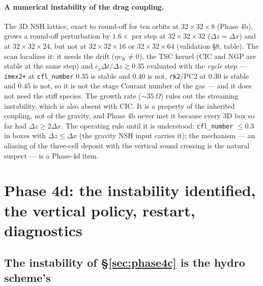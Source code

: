 \documentclass[11pt]{article}
\newcommand{\code}[1]{\texttt{#1}}
\begin{document}
\paragraph{A numerical instability of the drag coupling.} The 3D NSH lattice, exact to
round-off for ten orbits at $32\times32\times8$ (Phase 4b), grows a round-off
perturbation by $1.6\times$ per step at $32\times32\times32$ ($\Delta z = \Delta x$) and
at $32\times32\times24$, but not at $32\times32\times16$ or $32\times32\times64$
(validation \S8, table). The scan localizes it: it needs the drift ($\eta v_K \ne 0$),
the TSC kernel (CIC and NGP are stable at the same step) and $c_s\Delta t/\Delta z
\gtrsim 0.35$ evaluated with the \emph{cycle} step --- \code{imex2+} at
\code{cfl\_number} $0.35$ is stable and $0.40$ is not, \code{rk2}/PC2 at $0.30$ is
stable and $0.45$ is not, so it is not the stage Courant number of the gas --- and it
does not need the stiff species. The growth rate ($\sim 35\,\Omega$) rules out the
streaming instability, which is also absent with CIC. It is a property of the inherited
coupling, not of the gravity, and Phase 4b never met it because every 3D box so far had
$\Delta z \ge 2\Delta x$. The operating rule until it is understood:
\code{cfl\_number} $\le 0.3$ in boxes with $\Delta z \le \Delta x$ (the gravity NSH input
carries it); the mechanism --- an aliasing of the three-cell deposit with the vertical
sound crossing is the natural suspect --- is a Phase-4d item.

\section{Phase 4d: the instability identified, the vertical policy, restart, diagnostics}
\label{sec:phase4d}

\subsection{The instability of \S\ref{sec:phase4c} is the hydro scheme's}
\end{document}
